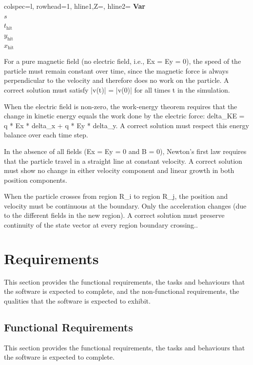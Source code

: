 \documentclass[12pt]{article}
\begin{document}
\begin{longtblr}
[caption={Output Data Constraints}]
{colspec={l}, rowhead=1, hline{1,Z}=\heavyrulewidth, hline{2}=\lightrulewidth}
\textbf{Var}
\\
$s$
\\
${t_{\text{hit}}}$
\\
${y_{\text{hit}}}$
\\
${x_{\text{hit}}}$
\label{Table:OutDataConstraints}
\end{longtblr}
For a pure magnetic field (no electric field, i.e., Ex = Ey = 0), the speed of the particle must remain constant over time, since the magnetic force is always perpendicular to the velocity and therefore does no work on the particle. A correct solution must satisfy |v(t)| = |v(0)| for all times t in the simulation.

When the electric field is non-zero, the work-energy theorem requires that the change in kinetic energy equals the work done by the electric force: delta\_KE = q * Ex * delta\_x + q * Ey * delta\_y. A correct solution must respect this energy balance over each time step.

In the absence of all fields (Ex = Ey = 0 and B = 0), Newton's first law requires that the particle travel in a straight line at constant velocity. A correct solution must show no change in either velocity component and linear growth in both position components.

When the particle crosses from region R\_i to region R\_j, the position and velocity must be continuous at the boundary. Only the acceleration changes (due to the different fields in the new region). A correct solution must preserve continuity of the state vector at every region boundary crossing..

\section{Requirements}
\label{Sec:Requirements}
This section provides the functional requirements, the tasks and behaviours that the software is expected to complete, and the non-functional requirements, the qualities that the software is expected to exhibit.

\subsection{Functional Requirements}
\label{Sec:FRs}
This section provides the functional requirements, the tasks and behaviours that the software is expected to complete.
\end{document}
